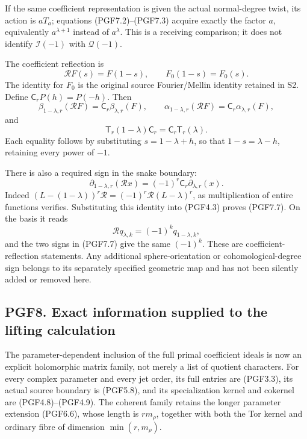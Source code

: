 If the same coefficient representation is given the actual normal-degree
twist, its action is \(aT_a\); equations (PGF7.2)--(PGF7.3) acquire
exactly the factor \(a\), equivalently \(a^{\lambda+1}\) instead of
\(a^\lambda\). This is a receiving comparison; it does not identify
\(\mathcal I(-1)\) with \(\mathcal Q(-1)\).

The coefficient reflection is \[
\mathcal RF(s)=F(1-s),\qquad F_0(1-s)=F_0(s).
\tag{PGF7.4}
\] The identity for \(F_0\) is the original source Fourier/Mellin
identity retained in S2. Define \(\mathsf C_rP(h)=P(-h)\). Then \[
\beta_{1-\lambda,r}(\mathcal RF)=\mathsf C_r\beta_{\lambda,r}(F),
\qquad
\alpha_{1-\lambda,r}(\mathcal RF)=\mathsf C_r\alpha_{\lambda,r}(F),
\tag{PGF7.5}
\] and \[
\mathsf T_r(1-\lambda)\mathsf C_r
=\mathsf C_r\mathsf T_r(\lambda).
\tag{PGF7.6}
\] Each equality follows by substituting \(s=1-\lambda+h\), so that
\(1-s=\lambda-h\), retaining every power of \(-1\).

There is also a required sign in the snake boundary: \[
\boxed{
\partial_{1-\lambda,r}(\mathcal R x)
=(-1)^r\mathsf C_r\partial_{\lambda,r}(x).
}
\tag{PGF7.7}
\] Indeed \((L-(1-\lambda))^r\mathcal R=(-1)^r\mathcal R(L-\lambda)^r\),
as multiplication of entire functions verifies. Substituting this
identity into (PGF4.3) proves (PGF7.7). On the basis it reads \[
\mathcal Rq_{\lambda,k}=(-1)^kq_{1-\lambda,k},
\tag{PGF7.8}
\] and the two signs in (PGF7.7) give the same \((-1)^k\). These are
coefficient-reflection statements. Any additional sphere-orientation or
cohomological-degree sign belongs to its separately specified geometric
map and has not been silently added or removed here.

\subsection{PGF8. Exact information supplied to the lifting
calculation}\label{pgf8.-exact-information-supplied-to-the-lifting-calculation}

The parameter-dependent inclusion of the full primal coefficient ideals
is now an explicit holomorphic matrix family, not merely a list of
quotient characters. For every complex parameter and every jet order,
its full entries are (PGF3.3), its actual source boundary is (PGF5.8),
and its specialization kernel and cokernel are (PGF4.8)--(PGF4.9). The
coherent family retains the longer parameter extension (PGF6.6), whose
length is \(r m_\rho\), together with both the Tor kernel and ordinary
fibre of dimension \(\min(r,m_\rho)\).

